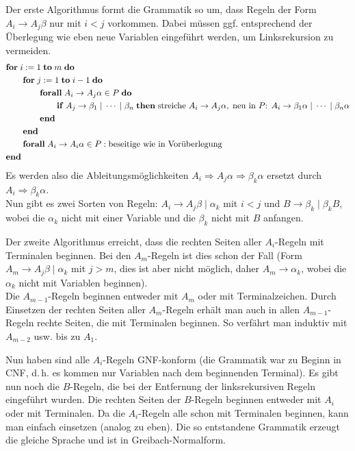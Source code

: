 \begin{Beweis}
    Der erste Algorithmus formt die Grammatik so um, dass Regeln der Form
    $A_i \rightarrow A_j \beta$ nur mit $i < j$ vorkommen.
    Dabei müssen ggf. entsprechend der Überlegung wie eben neue Variablen
    eingeführt werden, um Linksrekursion zu vermeiden.
    \begin{align*}
        &\mathbf{for}\; i := 1 \;\mathbf{to}\; m \;\mathbf{do}\;\\
        &\qquad\mathbf{for}\; j := 1 \;\mathbf{to}\; i - 1 \;\mathbf{do}\;\\
        &\qquad\qquad\mathbf{forall}\; A_i \rightarrow A_j \alpha \in P \;\mathbf{do}\;\\
        &\qquad\qquad\qquad\mathbf{if}\; A_j \rightarrow
        \beta_1 \;|\; \dotsb \;|\; \beta_n
        \;\mathbf{then}\; \text{streiche }A_i \rightarrow A_j \alpha,\;
        \text{neu in }P\text{: } A_i \rightarrow \beta_1 \alpha \;|\; \dotsb
        \;|\; \beta_n \alpha\\
        &\qquad\qquad\mathbf{end}\;\\
        &\qquad\mathbf{end}\;\\
        &\qquad\mathbf{forall}\; A_i \rightarrow A_i \alpha \in P:
        \text{beseitige wie in Vorüberlegung}\\
        &\mathbf{end}\;
    \end{align*}
    Es werden also die Ableitungsmöglichkeiten
    $A_i \Rightarrow A_j \alpha \Rightarrow \beta_k \alpha$ ersetzt durch
    $A_i \Rightarrow \beta_k \alpha$.\\
    Nun gibt es zwei Sorten von Regeln:
    $A_i \rightarrow A_j \beta \;|\; \alpha_k$ mit $i < j$ und
    $B \rightarrow \beta_k \;|\; \beta_k B$, wobei die
    $\alpha_k$ nicht mit einer Variable und die
    $\beta_k$ nicht mit $B$ anfangen.

    Der zweite Algorithmus erreicht, dass die rechten Seiten aller $A_i$-Regeln
    mit Terminalen beginnen.
    Bei den $A_m$-Regeln ist dies schon der Fall
    (Form $A_m \rightarrow A_j \beta \;|\; \alpha_k$ mit $j > m$,
    dies ist aber nicht möglich, daher
    $A_m \rightarrow \alpha_k$, wobei die $\alpha_k$ nicht mit Variablen
    beginnen).\\
    Die $A_{m-1}$-Regeln beginnen entweder mit $A_m$ oder mit Terminalzeichen.
    Durch Einsetzen der rechten Seiten aller $A_m$-Regeln erhält man auch in
    allen $A_{m-1}$-Regeln rechte Seiten, die mit Terminalen beginnen.
    So verfährt man induktiv mit $A_{m-2}$ usw. bis zu $A_1$.

    Nun haben sind alle $A_i$-Regeln GNF-konform
    (die Grammatik war zu Beginn in CNF, d.\,h. es kommen nur Variablen
    nach dem beginnenden Terminal).
    Es gibt nun noch die $B$-Regeln, die bei der Entfernung der linksrekursiven
    Regeln eingeführt wurden.
    Die rechten Seiten der $B$-Regeln beginnen entweder mit $A_i$ oder mit
    Terminalen.
    Da die $A_i$-Regeln alle schon mit Terminalen beginnen, kann man einfach
    einsetzen (analog zu eben).
    Die so entstandene Grammatik erzeugt die gleiche Sprache und ist in
    Greibach-Normalform.
\end{Beweis}

